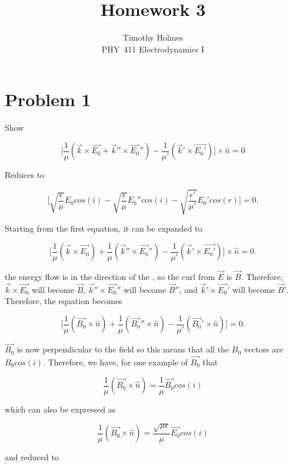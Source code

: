 \documentclass[11pt]{article}
\newcommand{\HWnum}{3}
\newcommand{\Subject}{PHY}
\begin{document}

\title{Homework {\HWnum}}
\author{Timothy Holmes \\ \Subject~411 Electrodynamics I}

\maketitle

\section*{Problem 1}

Show 

$$
\Bigg[\frac{1}{\mu}(\vec{k} \times \vec{E_{0}} + \vec{k}'' \times \vec{E_{0}}'') - \frac{1}{\mu'}(\vec{k}' \times \vec{E_{0}'})\Bigg] \times \hat{n} = 0
$$

Reduces to 

$$
\Bigg[\sqrt{\frac{\epsilon}{\mu}}E_{0}cos(i) - \sqrt{\frac{\epsilon}{\mu}}E_{0}''cos(i) - 
\sqrt{\frac{\epsilon'}{\mu'}}E_{0}'cos(r)\Bigg] = 0.
$$

Starting from the first equation, it can be expanded to 

$$
\Bigg[\frac{1}{\mu}(\vec{k} \times \vec{E_{0}}) + \frac{1}{\mu}(\vec{k}'' \times \vec{E_{0}}'') - \frac{1}{\mu'}(\vec{k}' \times \vec{E_{0}'})\Bigg] \times \hat{n} = 0.
$$

the energy flow is in the direction of the , so the curl from $\vec{E}$ is $\vec{B}$. Therefore, $\vec{k} \times \vec{E_{0}}$ will become $\vec{B}$, $\vec{k}'' \times \vec{E_{0}}''$ will become $\vec{B}''$, and $\vec{k}' \times \vec{E_{0}}'$ will become $\vec{B}'$. Therefore, the equation becomes

$$
\Bigg[\frac{1}{\mu}(\vec{B_{0}} \times \hat{n}) + \frac{1}{\mu}(\vec{B_{0}}'' \times \hat{n}) - \frac{1}{\mu'}(\vec{B_{0}}' \times \hat{n})\Bigg] = 0.
$$

$\vec{B_{0}}$ is now perpendicular to the field so this means that all the $B_{0}$ vectors are $B_{0}cos(i)$. Therefore, we have, for one example of $\vec{B_{0}}$ that

$$
\frac{1}{\mu}(\vec{B_{0}} \times \hat{n}) = \frac{1}{\mu}\vec{B_{0}}cos(i)
$$

which can also be expressed as

$$
\frac{1}{\mu}(\vec{B_{0}} \times \hat{n}) = \frac{\sqrt{\mu\epsilon}}{\mu}\vec{E_{0}}cos(i)
$$

and reduced to
\end{document}
